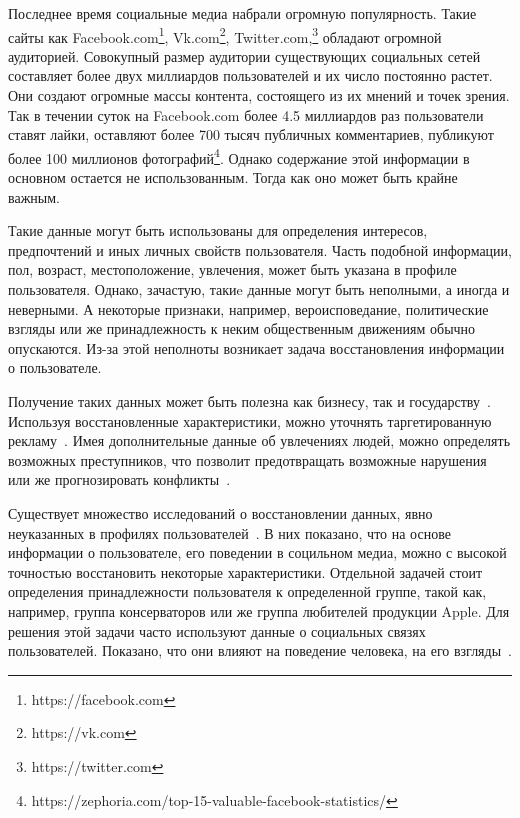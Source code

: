 \documentclass[annotation,times,page4]{itmo-student-thesis}
\begin{document}
\makemastertitle

\tableofcontents

\startprefacepage

Последнее время социальные медиа набрали огромную популярность. Такие сайты как Facebook.com\footnote{https://facebook.com}, Vk.com\footnote{https://vk.com}, Twitter.com,\footnote{https://twitter.com} обладают огромной аудиторией. Совокупный размер аудитории существующих социальных сетей составляет более двух миллиардов пользователей и их число постоянно растет. Они создают огромные массы контента, состоящего из их мнений и точек зрения. Так в течении суток на Facebook.com более 4.5 миллиардов раз пользователи ставят лайки, оставляют более 700 тысяч публичных комментариев, публикуют более 100 миллионов фотографий\footnote{https://zephoria.com/top-15-valuable-facebook-statistics/}. Однако содержание этой информации в основном остается не использованным. Тогда как оно может быть крайне важным.

Такие данные могут быть использованы для определения интересов, предпочтений и иных личных свойств пользователя. Часть подобной информации, пол, возраст,  местоположение, увлечения, может быть указана в профиле пользователя. Однако, зачастую, такиe данные могут быть неполными, а иногда и неверными. А некоторые признаки, например, вероисповедание, политические взгляды или же принадлежность к неким общественным движениям обычно опускаются. Из-за этой неполноты возникает задача восстановления информации о пользователе.

Получение таких данных может быть полезна как бизнесу, так и государству~\cite{ramakrishnan2014beating}. Используя восстановленные характеристики, можно уточнять таргетированную рекламу~\cite{swearingen2001beyond}. Имея дополнительные данные об увлечениях людей, можно определять возможных преступников, что позволит предотвращать возможные нарушения или же прогнозировать конфликты~\cite{grothoff2016nsa}.

Существует множество исследований о восстановлении данных, явно неуказанных в профилях пользователей~\cite{blachnio2015facebook, schwartz2013personality, turdakov2013opredelenie, peersman2011predicting}. В них показано, что на основе информации о пользователе, его поведении в социльном медиа, можно с высокой точностью восстановить некоторые характеристики. 
Отдельной задачей стоит определения принадлежности пользователя к определенной группе, такой как, например, группа консерваторов или же группа любителей продукции Apple. Для решения  этой задачи часто используют данные о социальных связях пользователей. Показано, что они влияют на поведение человека, на его взгляды~\cite{trusov2010determining, bond201261}. 
\end{document}
